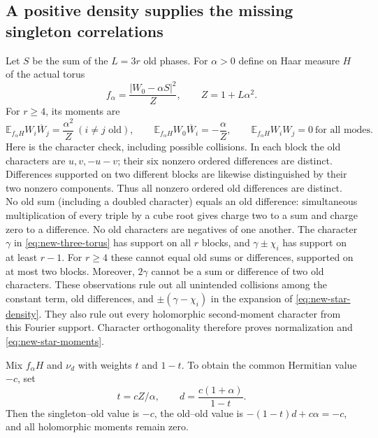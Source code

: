 \documentclass[11pt,a4paper]{article}
\theoremstyle{definition}\newtheorem{definition}[theorem]{Definition}
\theoremstyle{remark}\newtheorem{remark}[theorem]{Remark}
\begin{document}
\subsection{A positive density supplies the missing singleton correlations}
Let $S$ be the sum of the $L=3r$ old phases. For $\alpha>0$ define
on Haar measure $H$ of the actual torus
\begin{equation}\label{eq:new-star-density}
 f_\alpha=\frac{|W_0-\alpha S|^2}{Z},\qquad Z=1+L\alpha^2.
\end{equation}
For $r\geq4$, its moments are
\begin{equation}\label{eq:new-star-moments}
 \mathbb E_{f_\alpha H}W_i\overline W_j=\frac{\alpha^2}{Z}
 \ (i\ne j\text{ old}),\qquad
 \mathbb E_{f_\alpha H}W_0\overline W_i=-\frac\alpha Z,
 \qquad \mathbb E_{f_\alpha H}W_iW_j=0
 \ \text{for all modes}.
\end{equation}
Here is the character check, including possible collisions. In each
block the old characters are $u,v,-u-v$; their six nonzero ordered
differences are distinct. Differences supported on two different
blocks are likewise distinguished by their two nonzero components.
Thus all nonzero ordered old differences are distinct. No old sum
(including a doubled character) equals an old difference: simultaneous
multiplication of every triple by a cube root gives charge two to a
sum and charge zero to a difference. No old characters are negatives
of one another.
The character $\gamma$ in \eqref{eq:new-three-torus} has support on
all $r$ blocks, and $\gamma\pm\chi_i$ has support on at least $r-1$.
For $r\geq4$ these cannot equal old sums or differences, supported on
at most two blocks. Moreover, $2\gamma$ cannot be a sum or difference
of two old characters. These observations rule out all unintended
collisions among the constant term, old differences, and
$\pm(\gamma-\chi_i)$ in the expansion of
\eqref{eq:new-star-density}. They also rule out every holomorphic
second-moment character from this Fourier support. Character
orthogonality therefore proves normalization and
\eqref{eq:new-star-moments}.

Mix $f_\alpha H$ and $\nu_d$ with weights $t$ and $1-t$. To obtain
the common Hermitian value $-c$, set
\begin{equation}\label{eq:new-mixture-parameters}
 t=cZ/\alpha,\qquad d=\frac{c(1+\alpha)}{1-t}.
\end{equation}
Then the singleton--old value is $-c$, the old--old value is
$-(1-t)d+c\alpha=-c$, and all holomorphic moments remain zero.
\end{document}
